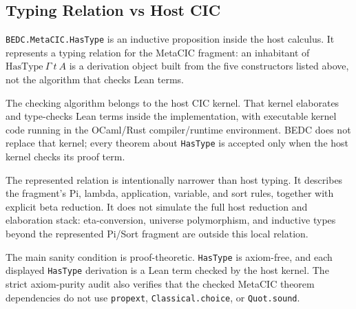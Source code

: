\subsection{Typing Relation vs Host CIC}\label{subsec:reconstruction-typing-vs-host}

\texttt{BEDC.MetaCIC.HasType} is an inductive proposition inside the host
calculus. It represents a typing relation for the MetaCIC fragment: an
inhabitant of $\mathrm{HasType}\ \Gamma\ t\ A$ is a derivation object built
from the five constructors listed above, not the algorithm that checks Lean
terms.

The checking algorithm belongs to the host CIC kernel. That kernel elaborates
and type-checks Lean terms inside the implementation, with executable kernel
code running in the OCaml/Rust compiler/runtime environment. BEDC does not
replace that kernel; every theorem about \texttt{HasType} is accepted only
when the host kernel checks its proof term.

The represented relation is intentionally narrower than host typing. It
describes the fragment's Pi, lambda, application, variable, and sort rules,
together with explicit beta reduction. It does not simulate the full host
reduction and elaboration stack: eta-conversion, universe polymorphism, and
inductive types beyond the represented Pi/Sort fragment are outside this local
relation.

The main sanity condition is proof-theoretic. \texttt{HasType} is axiom-free,
and each displayed \texttt{HasType} derivation is a Lean term checked by the
host kernel. The strict axiom-purity audit also verifies that the checked
MetaCIC theorem dependencies do not use \texttt{propext},
\texttt{Classical.choice}, or \texttt{Quot.sound}.
